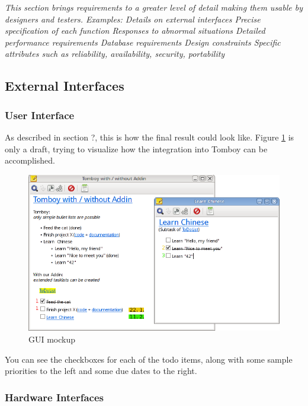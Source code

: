 \textit{This section brings requirements to a greater level of detail making them usable by designers and testers. Examples:
Details on external interfaces
Precise specification of each function
Responses to abnormal situations
Detailed performance requirements
Database requirements
Design constraints
Specific attributes such as reliability, availability, security, portability}

\subsection{External Interfaces}
\label{requirements:interfaces}

	\subsubsection{User Interface}
	\label{requirements:interfaces:user}
        
        As described in section ?, this is how the final result could look like. Figure \ref{gui} is only a draft, trying to visualize how the integration into Tomboy can be accomplished.
        \begin{figure}[h]
          \includegraphics[width=\textwidth]{graphics/Screenshot_cropped_edited.png}
          \caption{GUI mockup}
          \label{gui}
        \end{figure}
        You can see the checkboxes for each of the todo items, along with some sample priorities to the left and some due dates to the right.
	
	\subsubsection{Hardware Interfaces}
	\label{requirements:interfaces:hardware}
	
